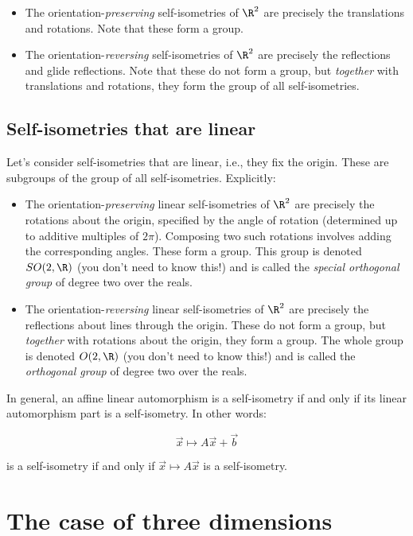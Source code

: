 \documentclass[10pt]{amsart}
\begin{document}
\begin{itemize}
\item The orientation-{\em preserving} self-isometries of $\R^2$ are
  precisely the translations and rotations. Note that these form a
  group.
\item The orientation-{\em reversing} self-isometries of $\R^2$ are
  precisely the reflections and glide reflections. Note that these do
  not form a group, but {\em together} with translations and
  rotations, they form the group of all self-isometries.
\end{itemize}

\subsection{Self-isometries that are linear}

Let's consider self-isometries that are linear, i.e., they fix the
origin. These are subgroups of the group of all
self-isometries. Explicitly:

\begin{itemize}
\item The orientation-{\em preserving} linear self-isometries of
  $\R^2$ are precisely the rotations about the origin, specified by
  the angle of rotation (determined up to additive multiples of
  $2\pi$). Composing two such rotations involves adding the
  corresponding angles. These form a group. This group is denoted
  $SO(2,\R)$ (you don't need to know this!) and is called the {\em
    special orthogonal group} of degree two over the reals.
\item The orientation-{\em reversing} linear self-isometries of $\R^2$
  are precisely the reflections about lines through the origin. These
  do not form a group, but {\em together} with rotations about the
  origin, they form a group. The whole group is denoted $O(2,\R)$ (you
  don't need to know this!) and is called the {\em orthogonal group}
  of degree two over the reals.
\end{itemize}

In general, an affine linear automorphism is a self-isometry if and
only if its linear automorphism part is a self-isometry. In other words:

$$\vec{x} \mapsto A\vec{x} + \vec{b}$$

is a self-isometry if and only if $\vec{x} \mapsto A\vec{x}$ is a
self-isometry.

\section{The case of three dimensions}
\end{document}
